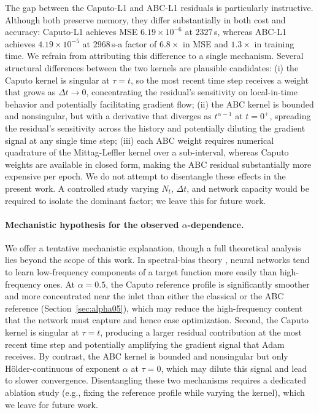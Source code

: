 \documentclass[11pt]{article}
\begin{document}
The gap between the Caputo-L1 and ABC-L1 residuals is particularly
instructive. Although both preserve memory, they differ substantially in
both cost and accuracy: Caputo-L1 achieves MSE \(6.19\times 10^{-6}\) at
\(2327\)\,s, whereas ABC-L1 achieves \(4.19\times 10^{-5}\) at
\(2968\)\,s-a factor of \(6.8\times\) in MSE and \(1.3\times\) in
training time. We refrain from attributing this difference to a single
mechanism. Several structural differences between the two kernels are
plausible candidates: (i) the Caputo kernel is singular at \(\tau=t\),
so the most recent time step receives a weight that grows as
\(\Delta t\to 0\), concentrating the residual's sensitivity on
local-in-time behavior and potentially facilitating gradient flow;
(ii) the ABC kernel is bounded and nonsingular, but with a
derivative that diverges as \(t^{\alpha-1}\) at \(t = 0^+\),
spreading the residual's sensitivity across the history and
potentially diluting the gradient signal at any single time step; (iii) each ABC
weight requires numerical quadrature of the Mittag-Leffler kernel over
a sub-interval, whereas Caputo weights are available in closed form,
making the ABC residual substantially more expensive per epoch. We do
not attempt to disentangle these effects in the present work. A
controlled study varying \(N_t\), \(\Delta t\), and network capacity
would be required to isolate the dominant factor; we leave this for
future work.

\paragraph{Mechanistic hypothesis for the observed \(\alpha\)-dependence.}
We offer a tentative mechanistic explanation, though a full theoretical
analysis lies beyond the scope of this work. In spectral-bias theory
\cite{Rahaman2019, Wang2021}, neural networks tend to learn low-frequency
components of a target function more easily than high-frequency ones.
At \(\alpha=0.5\), the Caputo reference profile is significantly smoother
and more concentrated near the inlet than either the classical or the
ABC reference (Section~\ref{sec:alpha05}), which may reduce the
high-frequency content that the network must capture and hence ease
optimization. Second, the Caputo kernel is singular at \(\tau=t\),
producing a larger residual contribution at the most recent time step
and potentially amplifying the gradient signal that Adam receives.
By contrast, the ABC kernel is bounded and nonsingular but only
Hölder-continuous of exponent \(\alpha\) at \(\tau=0\), which may
dilute this signal and lead to slower convergence.
Disentangling these two mechanisms requires a dedicated ablation study
(e.g., fixing the reference profile while varying the kernel), which we
leave for future work.
\end{document}
